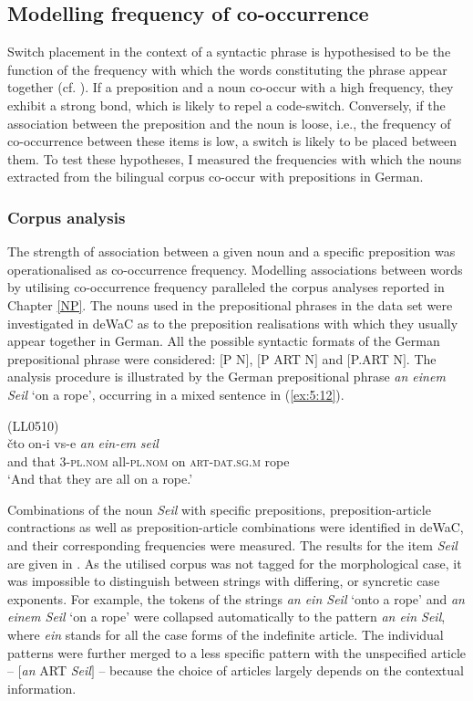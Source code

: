 \subsection{Modelling frequency of co-occurrence}

Switch placement in the context of a syntactic phrase is hypothesised to be the function of the frequency with which the words constituting the phrase appear together (cf. \citealt[33]{bybee-book-2010}). If a preposition and a noun co-occur with a high frequency, they exhibit a strong bond, which is likely to repel a code-switch. Conversely, if the association between the preposition and the noun is loose, i.e., the frequency of co-occurrence between these items is low, a switch is likely to be placed between them. To test these hypotheses, I measured the frequencies with which the nouns extracted from the bilingual corpus co-occur with prepositions in German.

\subsubsection{Corpus analysis}

\noindent The strength of association between a given noun and a specific preposition was operationalised as co-occurrence frequency.  Modelling associations between words by utilising co-occurrence frequency paralleled the corpus analyses reported in Chapter \ref{NP}. The nouns used in the prepositional phrases in the data set were investigated in deWaC as to the preposition realisations with which they usually appear together in German. All the possible syntactic formats of the German prepositional phrase were considered: $[$P N$]$, $[$P ART N$]$ and $[$P.ART N$]$. The analysis procedure is illustrated by the German prepositional phrase \textit{an einem Seil} `on a rope', occurring in a mixed sentence in (\ref{ex:5:12}).

\ea
\label{ex:5:12}
(LL0510)\\
 {čto} {on-i} {vs-e} \textit{an} \textit{ein-em} \textit{seil}\\
	{and} that 3-\textsc{pl.nom} all-\textsc{pl.nom} on \textsc{art-dat.sg.m} rope\\
\glt `And that they are all on a rope.'
\z

\noindent Combinations of the noun \textit{Seil} with specific prepositions, preposition-article contractions as well as preposition-article combinations were identified in deWaC, and their corresponding frequencies were measured. The results for the item \textit{Seil} are given in . As the utilised corpus was not tagged for the morphological case, it was impossible to distinguish between strings with differing, or syncretic case exponents. For example, the tokens of the strings \textit{an ein Seil} `onto a rope' and \textit{an einem Seil} `on a rope' were collapsed automatically to the pattern \textit{an ein Seil}, where \textit{ein} stands for all the case forms of the indefinite article. The individual patterns were further merged to a less specific pattern with the unspecified article -- $[$\textit{an} ART \textit{Seil}$]$ -- because the choice of articles largely depends on the contextual information.

